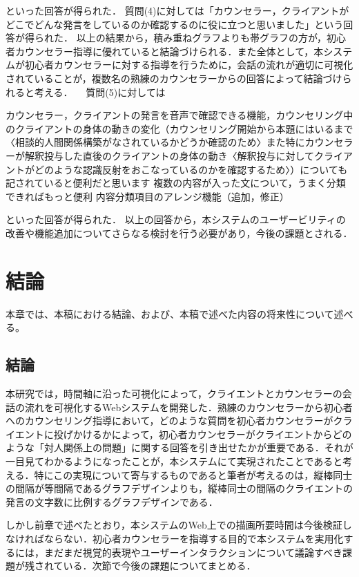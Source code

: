 \documentclass[shuuron]{kuee}
\begin{document}
  といった回答が得られた．
  質問(4)に対しては「カウンセラー，クライアントが　　どこでどんな発言をしているのか確認するのに役に立つと思いました」という回答が得られた．
  以上の結果から，積み重ねグラフよりも帯グラフの方が，初心者カウンセラー指導に優れていると結論づけられる．また全体として，本システムが初心者カウンセラーに対する指導を行うために，会話の流れが適切に可視化されていることが，複数名の熟練のカウンセラーからの回答によって結論づけられると考える．
  　質問(5)に対しては

   	カウンセラー，クライアントの発言を音声で確認できる機能，カウンセリング中のクライアントの身体の動きの変化（カウンセリング開始から本題にはいるまで〈相談的人間関係構築がなされているかどうか確認のため〉また特にカウンセラーが解釈投与した直後のクライアントの身体の動き〈解釈投与に対してクライアントがどのような認識反射をおこなっているのかを確認するため〉）についても記されていると便利だと思います
   	複数の内容が入った文について，うまく分類できればもっと便利
   	内容分類項目のアレンジ機能（追加，修正）

  といった回答が得られた．
  以上の回答から，本システムのユーザービリティの　改善や機能追加についてさらなる検討を行う必要があり，今後の課題とされる．


\chapter{結論}

本章では、本稿における結論、および、本稿で述べた内容の将来性について述べる。

\section{結論}

本研究では，時間軸に沿った可視化によって，クライエントとカウンセラーの会話の流れを可視化するWebシステムを開発した．熟練のカウンセラーから初心者へのカウンセリング指導において，どのような質問を初心者カウンセラーがクライエントに投げかけるかによって，初心者カウンセラーがクライエントからどのような「対人関係上の問題」に関する回答を引き出せたかが重要である．それが一目見てわかるようになったことが，本システムにて実現されたことであると考える．特にこの実現について寄与するものであると筆者が考えるのは，縦棒同士の間隔が等間隔であるグラフデザインよりも，縦棒同士の間隔のクライエントの発言の文字数に比例するグラフデザインである．

しかし前章で述べたとおり，本システムのWeb上での描画所要時間は今後検証しなければならない．初心者カウンセラーを指導する目的で本システムを実用化するには，まだまだ視覚的表現やユーザーインタラクションについて議論すべき課題が残されている．次節で今後の課題についてまとめる．
\end{document}
